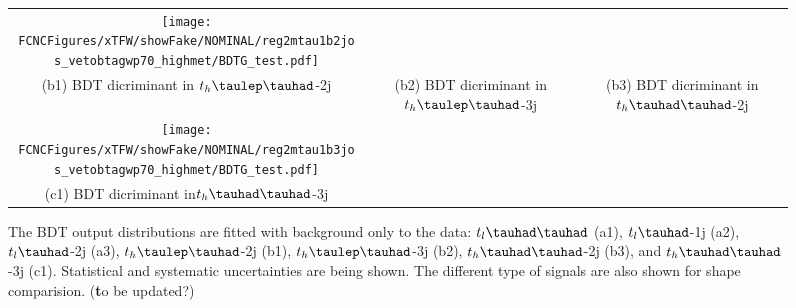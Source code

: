 \begin{figure}[H]
\begin{tabular}{@{}ccc@{}}
  \texttt{[image: \\FCNCFigures/xTFW/showFake/NOMINAL/reg2mtau1b2jos\_vetobtagwp70\_highmet/BDTG\_test.pdf]}\\
(b1) BDT dicriminant in $t_h\tlhad$-2j & (b2) BDT dicriminant in  $t_h\tlhad$-3j & (b3) BDT dicriminant in $t_h\thadhad$-2j \\
  \texttt{[image: \\FCNCFigures/xTFW/showFake/NOMINAL/reg2mtau1b3jos\_vetobtagwp70\_highmet/BDTG\_test.pdf]}& \\
(c1) BDT dicriminant in$t_h\thadhad$-3j\\
\end{tabular}
\caption{ The BDT output distributions are fitted with background only to the data: $t_l\thadhad$ (a1),  $t_l\tauhad$-1j (a2),  $t_l\tauhad$-2j (a3),
  $t_h\tlhad$-2j (b1), $t_h\tlhad$-3j (b2), $t_h\thadhad$-2j (b3), and $t_h\thadhad$-3j (c1).
  Statistical and systematic uncertainties are being shown. The different type of signals are also shown for shape comparision. ({\textbf to be updated?})}
\label{fig:Bonlyfit_data}
\end{figure}


